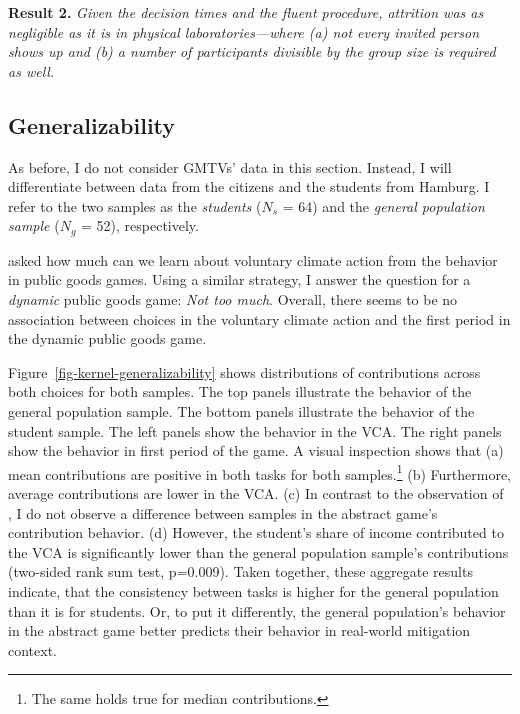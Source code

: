 \documentclass[
  authoryear,
  review,
  3p,
  onecolumn]{elsarticle}
\begin{document}
\textbf{Result 2.} \emph{Given the decision times and the fluent
procedure, attrition was as negligible as it is in physical
laboratories---where (a) not every invited person shows up and (b) a
number of participants divisible by the group size is required as well.}

\hypertarget{sec-generalizability}{%
\subsection{Generalizability}\label{sec-generalizability}}

As before, I do not consider GMTVs' data in this section. Instead, I
will differentiate between data from the citizens and the students from
Hamburg. I refer to the two samples as the \emph{students} (\(N_s\) =
64) and the \emph{general population sample} (\(N_g\) = 52),
respectively.

\citet{GKLS2020} asked how much can we learn about voluntary climate
action from the behavior in public goods games. Using a similar
strategy, I answer the question for a \emph{dynamic} public goods game:
\emph{Not too much}. Overall, there seems to be no association between
choices in the voluntary climate action and the first period in the
dynamic public goods game.

Figure~\ref{fig-kernel-generalizability} shows distributions of
contributions across both choices for both samples. The top panels
illustrate the behavior of the general population sample. The bottom
panels illustrate the behavior of the student sample. The left panels
show the behavior in the VCA. The right panels show the behavior in
first period of the game. A visual inspection shows that (a) mean
contributions are positive in both tasks for both samples.\footnote{The
  same holds true for median contributions.} (b) Furthermore, average
contributions are lower in the VCA. (c) In contrast to the observation
of \citet{GKLS2020}, I do not observe a difference between samples in
the abstract game's contribution behavior. (d) However, the student's
share of income contributed to the VCA is significantly lower than the
general population sample's contributions (two-sided rank sum test,
p=0.009). Taken together, these aggregate results indicate, that the
consistency between tasks is higher for the general population than it
is for students. Or, to put it differently, the general population's
behavior in the abstract game better predicts their behavior in
real-world mitigation context.
\end{document}
